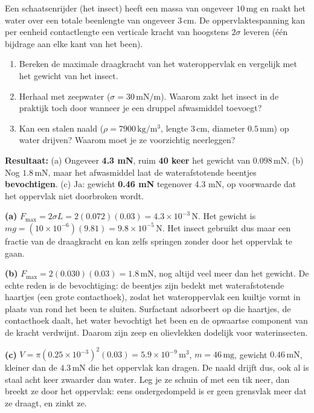 \begin{oefening}
Een schaatsenrijder (het insect) heeft een massa van ongeveer \(10\,\mathrm{mg}\) en raakt het water over een totale beenlengte van ongeveer \(3\,\mathrm{cm}\). De oppervlaktespanning kan per eenheid contactlengte een verticale kracht van hoogstens \(2\sigma\) leveren (één bijdrage aan elke kant van het been).

\begin{enumerate}
\item[(a)]
  Bereken de maximale draagkracht van het wateroppervlak en vergelijk met het gewicht van het insect.
\item[(b)]
  Herhaal met zeepwater (\(\sigma = 30\,\mathrm{mN/m}\)). Waarom zakt het insect in de praktijk toch door wanneer je een druppel afwasmiddel toevoegt?
\item[(c)]
  Kan een stalen naald (\(\rho = 7900\,\mathrm{kg/m^3}\), lengte \(3\,\mathrm{cm}\), diameter \(0.5\,\mathrm{mm}\)) op water drijven? Waarom moet je ze voorzichtig neerleggen?
\end{enumerate}
\end{oefening}
\begin{oplossing}
\textbf{Resultaat:} (a) Ongeveer \textbf{4.3 mN}, ruim \textbf{40 keer} het gewicht van \(0.098\,\mathrm{mN}\). (b) Nog \(1.8\,\mathrm{mN}\), maar het afwasmiddel laat de waterafstotende beentjes \textbf{bevochtigen}. (c) Ja: gewicht \textbf{0.46 mN} tegenover 4.3 mN, op voorwaarde dat het oppervlak niet doorbroken wordt.

\textbf{(a)} \(F_{\max} = 2\sigma L = 2(0.072)(0.03) = 4.3\times10^{-3}\,\mathrm{N}\). Het gewicht is \(mg = (10\times10^{-6})(9.81) = 9.8\times10^{-5}\,\mathrm{N}\). Het insect gebruikt dus maar een fractie van de draagkracht en kan zelfs springen zonder door het oppervlak te gaan.

\textbf{(b)} \(F_{\max} = 2(0.030)(0.03) = 1.8\,\mathrm{mN}\), nog altijd veel meer dan het gewicht. De echte reden is de bevochtiging: de beentjes zijn bedekt met waterafstotende haartjes (een grote contacthoek), zodat het wateroppervlak een kuiltje vormt in plaats van rond het been te sluiten. Surfactant adsorbeert op die haartjes, de contacthoek daalt, het water bevochtigt het been en de opwaartse component van de kracht verdwijnt. Daarom zijn zeep en olievlekken dodelijk voor waterinsecten.

\textbf{(c)} \(V = \pi(0.25\times10^{-3})^2(0.03) = 5.9\times10^{-9}\,\mathrm{m^3}\), \(m = 46\,\mathrm{mg}\), gewicht \(0.46\,\mathrm{mN}\), kleiner dan de \(4.3\,\mathrm{mN}\) die het oppervlak kan dragen. De naald drijft dus, ook al is staal acht keer zwaarder dan water. Leg je ze schuin of met een tik neer, dan breekt ze door het oppervlak: eens ondergedompeld is er geen grensvlak meer dat ze draagt, en zinkt ze.
\end{oplossing}

